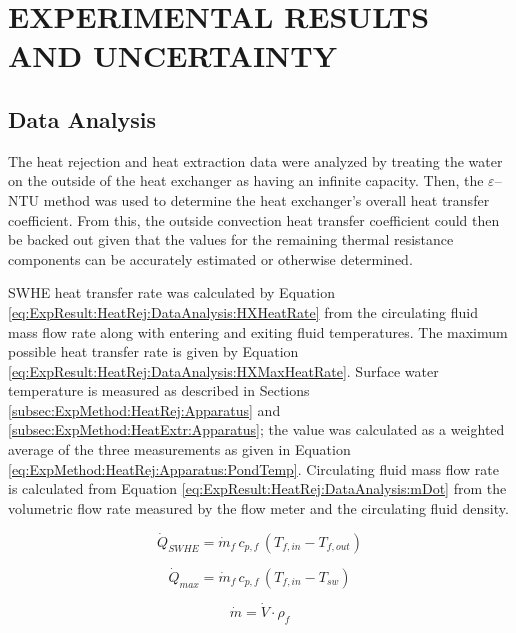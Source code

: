 
\chapter{EXPERIMENTAL RESULTS AND UNCERTAINTY}
\label{ch:ExpResult}

\section{Data Analysis}
\label{sec:ExpResult:HeatRej:DataAnalysis}
	
The heat rejection and heat extraction data were analyzed by treating the water on the outside of the heat exchanger as having an infinite capacity. Then, the $\varepsilon$--NTU method was used to determine the heat exchanger's overall heat transfer coefficient. From this, the outside convection heat transfer coefficient could then be backed out given that the values for the remaining thermal resistance components can be accurately estimated or otherwise determined.

SWHE heat transfer rate was calculated by Equation \ref{eq:ExpResult:HeatRej:DataAnalysis:HXHeatRate} from the circulating fluid mass flow rate along with entering and exiting fluid temperatures. The maximum possible heat transfer rate is given by Equation \ref{eq:ExpResult:HeatRej:DataAnalysis:HXMaxHeatRate}.  Surface water temperature is measured as described in Sections \ref{subsec:ExpMethod:HeatRej:Apparatus} and \ref{subsec:ExpMethod:HeatExtr:Apparatus}; the value was calculated as a weighted average of the three measurements as given in Equation \ref{eq:ExpMethod:HeatRej:Apparatus:PondTemp}. Circulating fluid mass flow rate is calculated from Equation \ref{eq:ExpResult:HeatRej:DataAnalysis:mDot} from the volumetric flow rate measured by the flow meter and the circulating fluid density.

	\begin{equation}
		\dot{Q}_{SWHE} = \dot{m}_f \, c_{p,f} \, (T_{f,in}-T_{f,out})
		\label{eq:ExpResult:HeatRej:DataAnalysis:HXHeatRate}
	\end{equation}
	

	\begin{equation}
		\dot{Q}_{max}=\dot{m}_f \, c_{p,f} \, (T_{f,in}-T_{sw})
		\label{eq:ExpResult:HeatRej:DataAnalysis:HXMaxHeatRate}
	\end{equation}
	
	\begin{equation}
		\dot{m} = \dot{V} \cdot \rho_f
		\label{eq:ExpResult:HeatRej:DataAnalysis:mDot}
	\end{equation}
	
